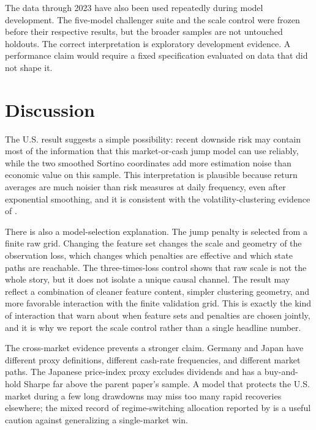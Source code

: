 \documentclass[11pt]{article}
\begin{document}
The data through 2023 have also been used repeatedly during model development.
The five-model challenger suite and the scale control were frozen before their
respective results, but the broader samples are not untouched holdouts. The
correct interpretation is exploratory development evidence. A performance claim
would require a fixed specification evaluated on data that did not shape it.

\section{Discussion}

The U.S. result suggests a simple possibility: recent downside risk may contain
most of the information that this market-or-cash jump model can use reliably,
while the two smoothed Sortino coordinates add more estimation noise than
economic value on this sample. This interpretation is plausible because return
averages are much noisier than risk measures at daily frequency, even after
exponential smoothing, and it is consistent with the volatility-clustering
evidence of \citet{schwert1989}.

There is also a model-selection explanation. The jump penalty is selected from a
finite raw grid. Changing the feature set changes the scale and geometry of the
observation loss, which changes which penalties are effective and which state
paths are reachable. The three-times-loss control shows that raw scale is not the
whole story, but it does not isolate a unique causal channel. The result may
reflect a combination of cleaner feature content, simpler clustering geometry,
and more favorable interaction with the finite validation grid. This is exactly
the kind of interaction that \citet{nystrup2021} warn about when feature sets and
penalties are chosen jointly, and it is why we report the scale control rather
than a single headline number.

The cross-market evidence prevents a stronger claim. Germany and Japan have
different proxy definitions, different cash-rate frequencies, and different
market paths. The Japanese price-index proxy excludes dividends and has a
buy-and-hold Sharpe far above the parent paper's sample. A model that protects
the U.S. market during a few long drawdowns may miss too many rapid recoveries
elsewhere; the mixed record of regime-switching allocation reported by
\citet{bulla2011} is a useful caution against generalizing a single-market win.
\end{document}
